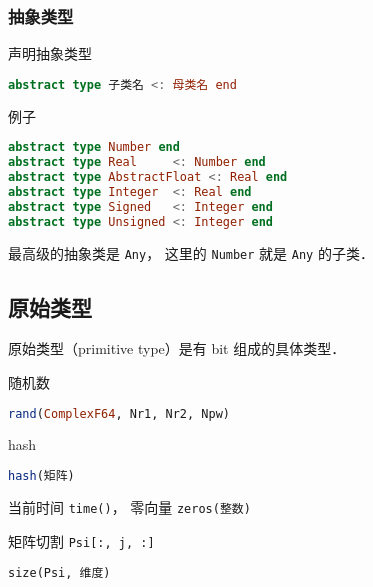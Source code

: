 \subsubsection{抽象类型}
声明抽象类型
\begin{lstlisting}[language=julia]
abstract type 子类名 <: 母类名 end
\end{lstlisting}
例子
\begin{lstlisting}[language=julia]
abstract type Number end
abstract type Real     <: Number end
abstract type AbstractFloat <: Real end
abstract type Integer  <: Real end
abstract type Signed   <: Integer end
abstract type Unsigned <: Integer end
\end{lstlisting}
最高级的抽象类是 \verb|Any|， 这里的 \verb|Number| 就是 \verb|Any| 的子类．

\subsection{原始类型}
原始类型（primitive type）是有 bit 组成的具体类型．

随机数
\begin{lstlisting}[language=julia]
rand(ComplexF64, Nr1, Nr2, Npw)
\end{lstlisting}

hash
\begin{lstlisting}[language=julia]
hash(矩阵)
\end{lstlisting}

当前时间 \verb|time()|， 零向量 \verb|zeros(整数)|

矩阵切割 \verb|Psi[:, j, :]|

\verb|size(Psi, 维度)|


